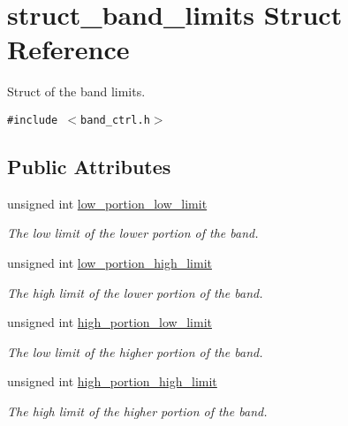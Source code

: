 \hypertarget{structstruct__band__limits}{
\section{struct\_\-band\_\-limits Struct Reference}
\label{structstruct__band__limits}
}
Struct of the band limits.  


{\tt \#include $<$band\_\-ctrl.h$>$}

\subsection*{Public Attributes}
\begin{CompactItemize}
\item 
\hypertarget{structstruct__band__limits_ccb7dd7c0bccb9458fdf17bf651dd8b6}{
unsigned int \hyperlink{structstruct__band__limits_ccb7dd7c0bccb9458fdf17bf651dd8b6}{low\_\-portion\_\-low\_\-limit}}
\label{structstruct__band__limits_ccb7dd7c0bccb9458fdf17bf651dd8b6}

\begin{CompactList}\small\item\em The low limit of the lower portion of the band. \item\end{CompactList}\item 
\hypertarget{structstruct__band__limits_31738ae8497bade5209cfb8443c8d51c}{
unsigned int \hyperlink{structstruct__band__limits_31738ae8497bade5209cfb8443c8d51c}{low\_\-portion\_\-high\_\-limit}}
\label{structstruct__band__limits_31738ae8497bade5209cfb8443c8d51c}

\begin{CompactList}\small\item\em The high limit of the lower portion of the band. \item\end{CompactList}\item 
\hypertarget{structstruct__band__limits_6d10d9fa9d75f0431b419574d27db917}{
unsigned int \hyperlink{structstruct__band__limits_6d10d9fa9d75f0431b419574d27db917}{high\_\-portion\_\-low\_\-limit}}
\label{structstruct__band__limits_6d10d9fa9d75f0431b419574d27db917}

\begin{CompactList}\small\item\em The low limit of the higher portion of the band. \item\end{CompactList}\item 
\hypertarget{structstruct__band__limits_738c8793b6f23e397229ecc7602e3401}{
unsigned int \hyperlink{structstruct__band__limits_738c8793b6f23e397229ecc7602e3401}{high\_\-portion\_\-high\_\-limit}}
\label{structstruct__band__limits_738c8793b6f23e397229ecc7602e3401}

\begin{CompactList}\small\item\em The high limit of the higher portion of the band. \item\end{CompactList}\end{CompactItemize}


